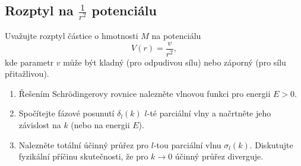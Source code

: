 \subsection{Rozptyl na $\frac{1}{r^{2}}$ potenciálu}
Uvažujte rozptyl částice o hmotnosti $M$ na potenciálu
\begin{equation}
    \label{eq:1r2PotentialV}
	V(r)=\frac{v}{r^{2}},
\end{equation}
kde parametr $v$ může být kladný (pro odpudivou sílu) nebo záporný (pro sílu přitažlivou).

\begin{enumerate}
	\item 
		Řešením Schrödingerovy rovnice nalezněte vlnovou funkci pro energii $E>0$.
		
	\item
		Spočítejte fázové posunutí $\delta_{l}(k)$ $l$-té parciální vlny 
		a načrtněte jeho závislost na $k$ (nebo na energii $E$).
		
	\item
		Nalezněte totální účinný průřez pro $l$-tou parciální vlnu $\sigma_{l}(k)$.
		Diskutujte fyzikální příčinu skutečnosti, že pro $k\rightarrow0$ účinný průřez diverguje.
\end{enumerate}


